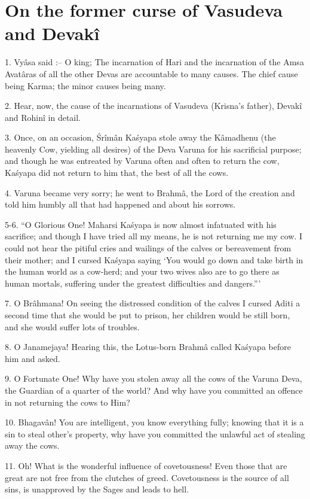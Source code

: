 ﻿\chapter{On the former curse of Vasudeva and Devak\^i}

1. Vy\^asa said :-- O king; The incarnation of Hari and the incarnation of the Amsa Avat\^aras of all the other Devas are accountable to many causes. The chief cause being Karma; the minor causes being many.

2. Hear, now, the cause of the incarnations of Vasudeva (Krisna's father), Devak\^i and Rohin\^i in detail.

3. Once, on an occasion, \'Sr\^im\^an Ka\'syapa stole away the K\^amadhenu (the heavenly Cow, yielding all desires) of the Deva Varuna for his sacrificial purpose; and though he was entreated by Varuna often and often to return the cow, Ka\'syapa did not return to him that, the best of all the cows.

4. Varuna became very sorry; he went to Brahm\^a, the Lord of the creation and told him humbly all that had happened and about his sorrows.

5-6. ``O Glorious One! Maharsi Ka\'syapa is now almost infatuated with his sacrifice; and though I have tried all my means, he is not returning me my cow. I could not hear the pitiful cries and wailings of the calves or bereavement from their mother; and I cursed Ka\'syapa saying ‘You would go down and take birth in the human world as a cow-herd; and your two wives also are to go there as human mortals, suffering under the greatest difficulties and dangers.'''

7. O Br\^ahmana! On seeing the distressed condition of the calves I cursed Aditi a second time that she would be put to prison, her children would be still born, and she would suffer lots of troubles.

8. O Janamejaya! Hearing this, the Lotus-born Brahm\^a  called Ka\'syapa before him and asked.

9. O Fortunate One! Why have you stolen away all the cows of the Varuna Deva, the Guardian of a quarter of the world? And why have you committed an offence in not returning the cows to Him?

10. Bhagav\^an! You are intelligent, you know everything fully; knowing that it is a sin to steal other's property, why have you committed the unlawful act of stealing away the cows.

11. Oh! What is the wonderful influence of covetousness! Even those that are great are not free from the clutches of greed. Covetousness is the source of all sins, is unapproved by the Sages and leads to hell.

